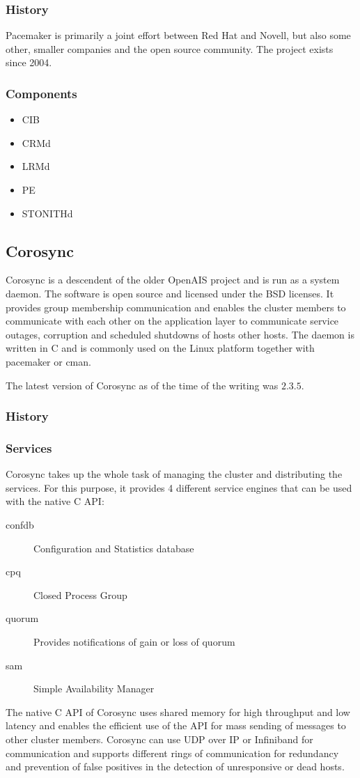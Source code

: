\subsubsection{History}
Pacemaker is primarily a joint effort between Red Hat and Novell, but also
some other, smaller companies and the open source community. The project
exists since 2004.
\subsubsection{Components}
\begin{itemize}
\item \ac{CIB}
\item \ac{CRMd}
\item \ac{LRMd}
\item \ac{PE}
\item \ac{STONITHd}
\end{itemize}
\subsection{Corosync}
Corosync is a descendent of the older OpenAIS project and is run as a system daemon. The software is open source and licensed under the BSD licenses. It provides group membership communication and enables the cluster members to communicate with each other on the application layer to communicate service outages, corruption and scheduled shutdowns of hosts other hosts. The daemon is written in C and is commonly used on the Linux platform together with pacemaker or cman.

The latest version of Corosync as of the time of the writing was $2.3.5$.
\subsubsection{History}
\subsubsection{Services}
Corosync takes up the whole task of managing the cluster and distributing the services. For this purpose, it provides 4 different service engines that can be used with the native C \ac{API}:
\begin{description}
\item [confdb] Configuration and Statistics database
\item [cpq] Closed Process Group
\item [quorum] Provides notifications of gain or loss of quorum
\item [sam] Simple Availability Manager
\end{description}
The native C API of Corosync uses shared memory for high throughput and low 
latency and enables the efficient use of the API for mass sending of messages to 
other cluster members.
\linebreak[3]
Corosync can use \ac{UDP} over IP or Infiniband for communication and supports different 
rings of communication for redundancy and prevention of false positives in the 
detection of unresponsive or dead hosts.
